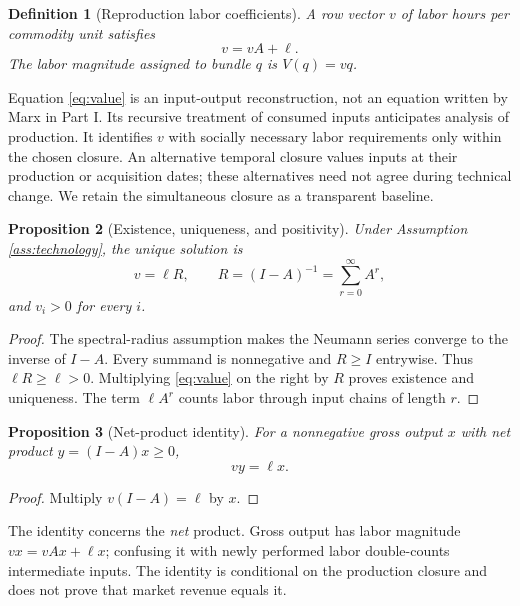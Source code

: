 \documentclass[11pt,letterpaper]{article}
\newtheorem{proposition}{Proposition}[section]
\newtheorem{definition}[proposition]{Definition}
\begin{document}
\begin{definition}[Reproduction labor coefficients]\label{def:value}
A row vector $v$ of labor hours per commodity unit satisfies
\begin{equation}\label{eq:value}
 v=vA+\ell.
\end{equation}
The labor magnitude assigned to bundle $q$ is $V(q)=vq$.
\end{definition}
Equation \eqref{eq:value} is an input-output reconstruction, not an
equation written by Marx in Part I. Its recursive treatment of consumed
inputs anticipates analysis of production. It identifies $v$ with
socially necessary labor requirements only within the chosen closure.
An alternative temporal closure values inputs at their production or
acquisition dates; these alternatives need not agree during technical
change. We retain the simultaneous closure as a transparent baseline.

\begin{proposition}[Existence, uniqueness, and positivity]\label{prop:values}
Under Assumption \ref{ass:technology}, the unique solution is
\begin{equation}\label{eq:inverse}
 v=\ell R,\qquad R=(I-A)^{-1}=\sum_{r=0}^{\infty}A^r,
\end{equation}
and $v_i>0$ for every $i$.
\end{proposition}
\begin{proof}
The spectral-radius assumption makes the Neumann series converge to the
inverse of $I-A$. Every summand is nonnegative and $R\ge I$ entrywise.
Thus $\ell R\ge\ell>0$. Multiplying \eqref{eq:value} on the right by
$R$ proves existence and uniqueness. The term $\ell A^r$ counts labor
through input chains of length $r$.
\end{proof}

\begin{proposition}[Net-product identity]\label{prop:net}
For a nonnegative gross output $x$ with net product $y=(I-A)x\ge0$,
\begin{equation}\label{eq:net}
 vy=\ell x.
\end{equation}
\end{proposition}
\begin{proof}
Multiply $v(I-A)=\ell$ by $x$.
\end{proof}
The identity concerns the \emph{net} product. Gross output has labor
magnitude $vx=vAx+\ell x$; confusing it with newly performed labor
double-counts intermediate inputs. The identity is conditional on the
production closure and does not prove that market revenue equals it.
\end{document}
